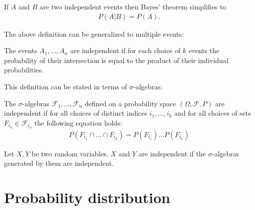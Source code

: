     \begin{result}
        If $A$ and $B$ are two independent events then Bayes' theorem simplifies to
        \begin{gather}
            P(A|B) = P(A).
        \end{gather}
    \end{result}
    The above definition can be generalized to multiple events:
    \begin{definition}
        The events $A_1,...,A_n$ are independent if for each choice of $k$ events the probability of their intersection is equal to the product of their individual probabilities.
    \end{definition}
    This definition can be stated in terms of $\sigma$-algebras:
    \begin{definition}
        The $\sigma$-algebras $\mathcal{F}_1,...,\mathcal{F}_n$ defined on a probability space $(\Omega,\mathcal{F},P)$ are independent if for all choices of distinct indices $i_1,...,i_k$ and for all choices of sets $F_{i_n}\in\mathcal{F}_{i_n}$ the following equation holds:
        \begin{gather}
            \label{prob:independent_sigma_algebras}
            P(F_{i_1}\cap...\cap F_{i_k}) = P(F_{i_1})...P(F_{i_k})
        \end{gather}
    \end{definition}
    \begin{result}
        Let $X,Y$ be two random variables. $X$ and $Y$ are independent if the $\sigma$-algebras generated by them are independent.
    \end{result}

\section{Probability distribution}


